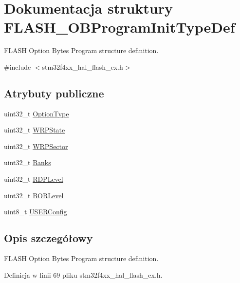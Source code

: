 \hypertarget{struct_f_l_a_s_h___o_b_program_init_type_def}{}\section{Dokumentacja struktury F\+L\+A\+S\+H\+\_\+\+O\+B\+Program\+Init\+Type\+Def}
\label{struct_f_l_a_s_h___o_b_program_init_type_def}


F\+L\+A\+SH Option Bytes Program structure definition.  




{\ttfamily \#include $<$stm32f4xx\+\_\+hal\+\_\+flash\+\_\+ex.\+h$>$}

\subsection*{Atrybuty publiczne}
\begin{DoxyCompactItemize}
\item 
uint32\+\_\+t \hyperlink{struct_f_l_a_s_h___o_b_program_init_type_def_a46bffc2a63ea02e15b9187856535d890}{Option\+Type}
\item 
uint32\+\_\+t \hyperlink{struct_f_l_a_s_h___o_b_program_init_type_def_a2607ba046f7a3af46e7209b8f1e9e20d}{W\+R\+P\+State}
\item 
uint32\+\_\+t \hyperlink{struct_f_l_a_s_h___o_b_program_init_type_def_aa3db423f4b3038a56b67ca2d48af79ff}{W\+R\+P\+Sector}
\item 
uint32\+\_\+t \hyperlink{struct_f_l_a_s_h___o_b_program_init_type_def_a5fdf437b5f79d79945f5c0777f76d0eb}{Banks}
\item 
uint32\+\_\+t \hyperlink{struct_f_l_a_s_h___o_b_program_init_type_def_a1f613ba2b87cf9caa84dc1d493e96dae}{R\+D\+P\+Level}
\item 
uint32\+\_\+t \hyperlink{struct_f_l_a_s_h___o_b_program_init_type_def_a51a6af507ed8f57590f19b6ba6c9c33d}{B\+O\+R\+Level}
\item 
uint8\+\_\+t \hyperlink{struct_f_l_a_s_h___o_b_program_init_type_def_ae6c9b55d49bc9627a2319ba680a924de}{U\+S\+E\+R\+Config}
\end{DoxyCompactItemize}


\subsection{Opis szczegółowy}
F\+L\+A\+SH Option Bytes Program structure definition. 

Definicja w linii 69 pliku stm32f4xx\+\_\+hal\+\_\+flash\+\_\+ex.\+h.



